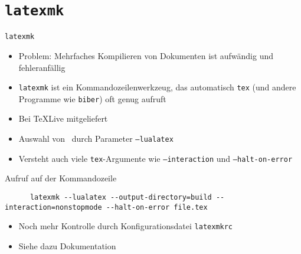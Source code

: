 \section{\texttt{latexmk}}

\begin{frame}[fragile]{
  \texttt{latexmk}
  \hfill
}
  \begin{itemize}
    \item Problem: Mehrfaches Kompilieren von Dokumenten ist aufwändig und fehleranfällig
    \item \texttt{latexmk} ist ein Kommandozeilenwerkzeug, das automatisch \texttt{tex} (und andere Programme wie \texttt{biber}) oft genug aufruft
    \item Bei TeXLive mitgeliefert
    \item Auswahl von \LuaLaTeX\ durch Parameter \texttt{--lualatex}
    \item Versteht auch viele \texttt{tex}-Argumente wie \texttt{--interaction} und \texttt{--halt-on-error}
  \end{itemize}

  \begin{block}{Aufruf auf der Kommandozeile}
    \begin{lstlisting}
      latexmk --lualatex --output-directory=build --interaction=nonstopmode --halt-on-error file.tex
    \end{lstlisting}
  \end{block}

  \begin{itemize}
    \item Noch mehr Kontrolle durch Konfigurationsdatei \texttt{latexmkrc}
    \item Siehe dazu Dokumentation
  \end{itemize}
\end{frame}

